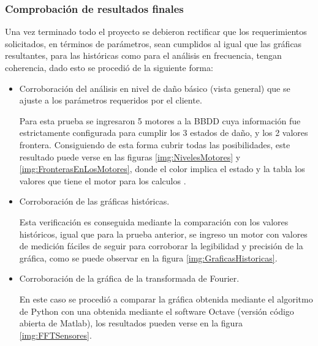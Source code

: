 \subsubsection{Comprobación de resultados finales}
Una vez terminado todo el proyecto se debieron rectificar que los requerimientos
solicitados, en términos de parámetros, sean cumplidos al igual que las gráficas
resultantes, para las históricas como para el análisis en frecuencia, tengan
coherencia, dado esto se procedió de la siguiente forma:

\begin{itemize}
    \item Corroboración del análisis en nivel de daño básico (vista general)
        que se ajuste a los parámetros requeridos por el cliente.

        Para esta prueba se ingresaron 5 motores a la BBDD cuya información fue
        estrictamente configurada para cumplir los 3 estados de daño, y los
        2 valores frontera. Consiguiendo de esta forma cubrir todas las
        posibilidades, este resultado puede verse en las figuras
        \ref{img:NivelesMotores}
        y
        \ref{img:FronterasEnLosMotores},     donde el color
        implica el estado y la tabla los valores que tiene el motor
        para los calculos .


\item Corroboración de las gráficas históricas.

        Esta verificación es conseguida mediante la comparación con los valores
        históricos, igual que para la prueba anterior, se ingreso un motor
        con valores de medición fáciles de seguir para corroborar la legibilidad
        y precisión de la gráfica, como se puede observar en la figura \ref{img:GraficasHistoricas}.

    \item Corroboración de la gráfica de la transformada de Fourier.

        En este caso se procedió a comparar la gráfica obtenida mediante el
        algoritmo de Python con una obtenida mediante el software Octave (versión
        código abierta de Matlab), los resultados pueden verse en la figura
        \ref{img:FFTSensores}.
\end{itemize}







